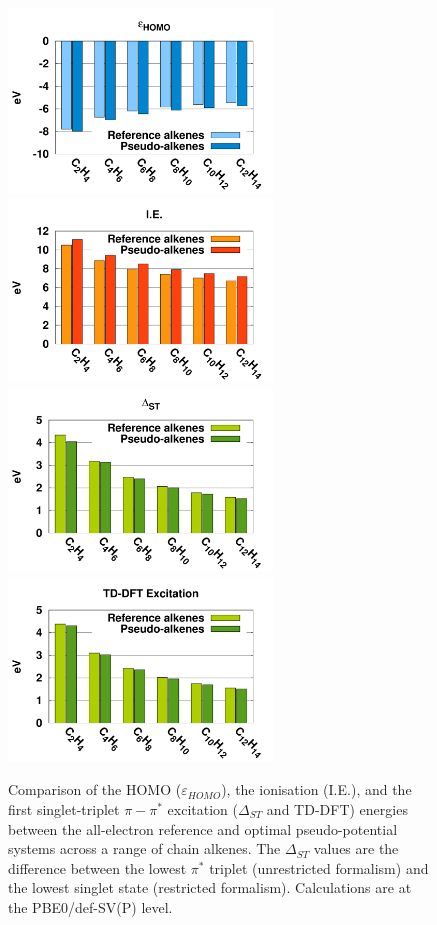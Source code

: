 \documentclass[aip]{revtex4-1}
\begin{document}
\begin{figure}
\begin{center}
\includegraphics[width=7cm]{short_pbe0_homo}
\includegraphics[width=7cm]{short_pbe0_ie}
\includegraphics[width=7cm]{short_pbe0_st}
\includegraphics[width=7cm]{short_pbe0_tddft}
\end{center}
\caption{Comparison of the HOMO ($\varepsilon_{HOMO}$),
the ionisation (I.E.), and
the first singlet-triplet $\pi-\pi^*$ excitation ($\Delta_{ST}$ and TD-DFT) energies
between the
all-electron reference and optimal pseudo-potential systems across a range of chain alkenes.
The $\Delta_{ST}$ values are the difference
between the lowest $\pi^*$ triplet (unrestricted formalism) and the lowest singlet state
(restricted formalism).
Calculations are at the PBE0/def-SV(P) level.}
\label{fig:alkenes_pbe0_dft}
\end{figure}
\end{document}
